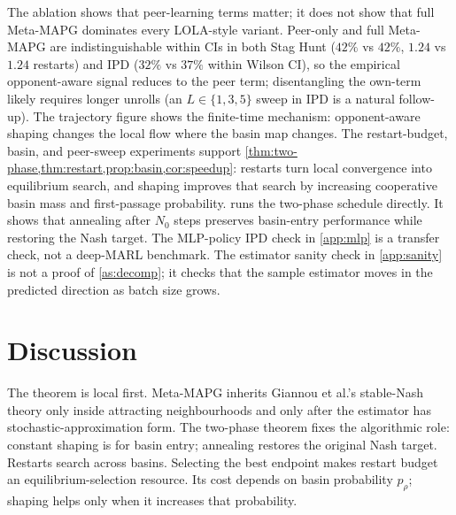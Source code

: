 \documentclass{nextgame2026} %
\begin{document}
\begin{table}[t]
  \centering
  \caption{Main 100-seed summary. Cooperative success uses a minimum initial-state cooperation threshold of $0.82$. Restart success and mean restarts are reported for all methods using paired restart initialisations.}
  \label{tab:results}
  \resizebox{\linewidth}{!}{}
\end{table}

The ablation shows that peer-learning terms matter; it does not show that full Meta-MAPG dominates every LOLA-style variant. Peer-only and full Meta-MAPG are indistinguishable within CIs in both Stag Hunt ($42\%$ vs $42\%$, $1.24$ vs $1.24$ restarts) and IPD ($32\%$ vs $37\%$ within Wilson CI), so the empirical opponent-aware signal reduces to the peer term; disentangling the own-term likely requires longer unrolls (an $L\in\{1,3,5\}$ sweep in IPD is a natural follow-up). The trajectory figure shows the finite-time mechanism: opponent-aware shaping changes the local flow where the basin map changes. The restart-budget, basin, and peer-sweep experiments support \cref{thm:two-phase,thm:restart,prop:basin,cor:speedup}: restarts turn local convergence into equilibrium search, and shaping improves that search by increasing cooperative basin mass and first-passage probability.  runs the two-phase schedule directly. It shows that annealing after $N_0$ steps preserves basin-entry performance while restoring the Nash target. The MLP-policy IPD check in \cref{app:mlp} is a transfer check, not a deep-MARL benchmark. The estimator sanity check in \cref{app:sanity} is not a proof of \cref{as:decomp}; it checks that the sample estimator moves in the predicted direction as batch size grows.

\section{Discussion}

The theorem is local first. Meta-MAPG inherits Giannou et al.'s stable-Nash theory only inside attracting neighbourhoods and only after the estimator has stochastic-approximation form. The two-phase theorem fixes the algorithmic role: constant shaping is for basin entry; annealing restores the original Nash target. Restarts search across basins. Selecting the best endpoint makes restart budget an equilibrium-selection resource. Its cost depends on basin probability $p_\rho$; shaping helps only when it increases that probability.
\end{document}
